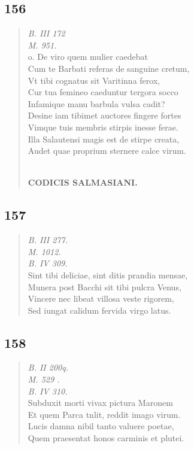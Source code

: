 \documentclass[11pt, a4paper]{report}
\begin{document}
            \subsection*{156}
      \begin{verse}
      \textit{B. III 172} \\ \textit{M. 951.} \\ o. De viro quem mulier caedebat \\ Cum te Barbati referas de sanguine cretum, \\ Vt tibi cognatus sit Varitinna ferox, \\ Cur tua femineo caeduntur tergora socco \\ Infamique manu barbula vulsa cadit? \\ Desine iam tibimet auctores fingere fortes \\ Vimque tuis membris stirpis inesse ferae. \\ Illa Salautensi magis est de stirpe creata, \\ Audet quae proprium sternere calce virum. \\ 
        ﻿\pagebreak 
    \begin{center} \textbf{CODICIS SALMASIANI.} \end{center} \marginpar{[147]} 
      \end{verse}
  
            \subsection*{157}
      \begin{verse}
      \textit{B. III 277.} \\ \textit{M. 1012.} \\ \textit{B. IV 309.} \\ Sint tibi deliciae, sint ditis prandia mensae, \\ Munera post Bacchi sit tibi pulcra Venus, \\ Vincere nec libeat villosa veste rigorem, \\ Sed iungat calidum fervida virgo latus. \\ 
      \end{verse}
  
            \subsection*{158}
      \begin{verse}
      \textit{B. II 200q.} \\ \textit{M. 529 .} \\ \textit{B. IV 310.} \\ Subduxit morti vivax pictura Maronem \\ Et quem Parca tnlit, reddit imago virum. \\ Lucis damna nibil tanto valuere poetae, \\ Quem praesentat honos carminis et plutei. \\ 
      \end{verse}
  
\end{document}
